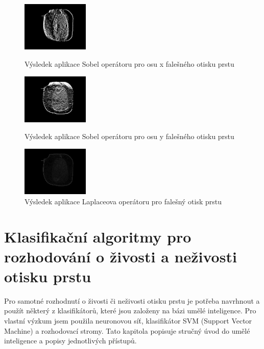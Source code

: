 \begin{figure}[!htbp]
  \begin{minipage}[b]{0.3\linewidth}
    \centering
    \includegraphics[width=120px]{obrazky-figures/sobelxfingerprint.png}
    \caption{Výsledek aplikace Sobel operátoru pro osu x falešného otisku prstu}
  \end{minipage}
  \hspace{0.3cm}
  \begin{minipage}[b]{0.3\linewidth}
    \centering
    \includegraphics[width=120px]{obrazky-figures/sobelyfingerprint.png}
    \caption{Výsledek aplikace Sobel operátoru pro osu y falešného otisku prstu}
  \end{minipage}
  \hspace{0.3cm}
    \begin{minipage}[b]{0.3\linewidth}
    \centering
    \includegraphics[width=120px]{obrazky-figures/laplacianfingerprint.png}
    \caption{Výsledek aplikace Laplaceova operátoru pro falešný otisk prstu}
  \end{minipage}
\end{figure}




\chapter{Klasifikační algoritmy pro rozhodování o živosti a neživosti otisku prstu}
Pro samotné rozhodnutí o živosti či neživosti otisku prstu je potřeba navrhnout a použít některý z klasifikátorů, které jsou založeny na bázi umělé inteligence. Pro vlastní výzkum jsem použila neuronovou síť, klasifikátor SVM (Support Vector Machine) a rozhodovací stromy. Tato kapitola popisuje stručný úvod do umělé inteligence a popisy jednotlivých přístupů.

